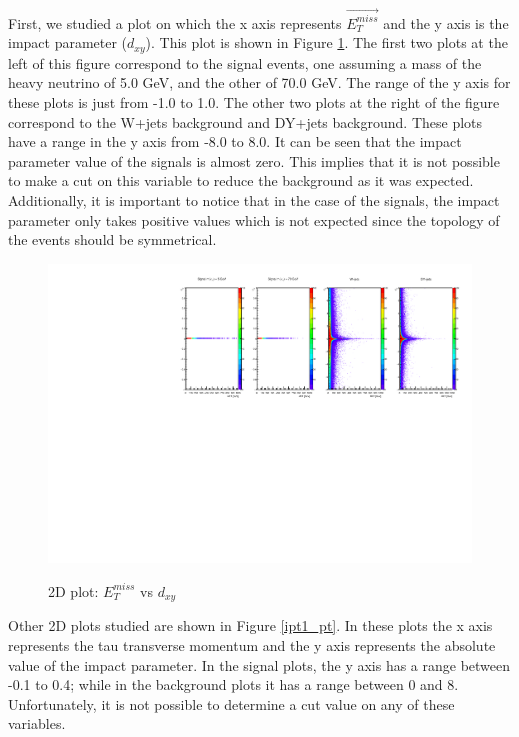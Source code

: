 First, we studied a plot on which the x axis 
represents $\vec{E_T^{miss}}$ and the y axis is the impact parameter ($d_{xy}$). This plot is shown in Figure \ref{ipt1_MET}. The first two plots at the left of this figure correspond to the signal events, one assuming a mass of the heavy neutrino of 5.0 GeV, and the other of 70.0 GeV. The range of the y axis for these plots is just from -1.0 to 1.0. The other two plots at the right of the figure correspond to the W+jets background and DY+jets background. These plots have a range in the y axis from -8.0 to 8.0. It can be seen that the impact parameter value of the signals is almost zero. This implies that it is not possible to make a cut on this variable to reduce the background as it was expected. Additionally, it is important to notice that in the case of the signals, the impact parameter only takes positive values which is not expected since the topology of the events should be symmetrical. 
 
 \begin{figure}[h] 
 \centering
 \caption{2D plot: $E_T^{miss}$ vs $d_{xy}$}
 \includegraphics[width=1.15\textwidth]{./Capitulos/Analysis/c1} 
 \label{ipt1_MET}
 \end{figure}
 
Other 2D plots studied are shown in Figure \ref{ipt1_pt}. In these plots the x axis represents the tau transverse momentum and the y axis represents the absolute value of the impact parameter. In the signal plots, the y axis has a range between -0.1 to 0.4; while in the background plots it has a range between 0 and 8. Unfortunately, it is not possible to determine a cut value on any of these variables.
 
